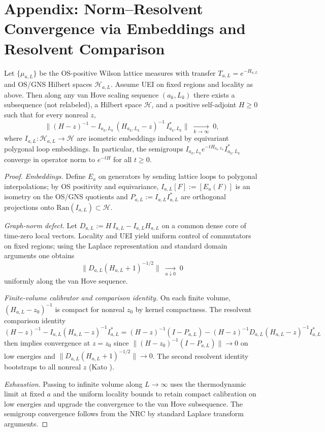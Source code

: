 \documentclass[11pt]{amsart}
\begin{document}
\medskip
\section{Appendix: Norm--Resolvent Convergence via Embeddings and Resolvent Comparison}

\begin{theorem}\label{thm:nrc-embeddings}
Let $\{\mu_{a,L}\}$ be the OS-positive Wilson lattice measures with transfer $T_{a,L}=e^{-H_{a,L}}$ and OS/GNS Hilbert spaces $\mathcal H_{a,L}$. Assume UEI on fixed regions and locality as above. Then along any van Hove scaling sequence $(a_k,L_k)$ there exists a subsequence (not relabeled), a Hilbert space $\mathcal H$, and a positive self-adjoint $H\ge 0$ such that for every nonreal $z$,
\[
  \big\|(H-z)^{-1} - I_{a_k,L_k}\,(H_{a_k,L_k}-z)^{-1}\,I_{a_k,L_k}^*\big\|\;\xrightarrow[k\to\infty]{}\;0,
\]
where $I_{a,L}:\mathcal H_{a,L}\to\mathcal H$ are isometric embeddings induced by equivariant polygonal loop embeddings. In particular, the semigroups $I_{a_k,L_k} e^{-tH_{a_k,L_k}} I_{a_k,L_k}^*$ converge in operator norm to $e^{-tH}$ for all $t\ge 0$.
\end{theorem}
\begin{proof}
\emph{Embeddings.} Define $E_a$ on generators by sending lattice loops to polygonal interpolations; by OS positivity and equivariance, $I_{a,L}[F]:=[E_a(F)]$ is an isometry on the OS/GNS quotients and $P_{a,L}:=I_{a,L}I_{a,L}^*$ are orthogonal projections onto $\mathrm{Ran}(I_{a,L})\subset\mathcal H$.

\emph{Graph-norm defect.} Let $D_{a,L}:=H\,I_{a,L}-I_{a,L}H_{a,L}$ on a common dense core of time-zero local vectors. Locality and UEI yield uniform control of commutators on fixed regions; using the Laplace representation and standard domain arguments one obtains
\[
  \big\|D_{a,L}(H_{a,L}+1)^{-1/2}\big\|\;\xrightarrow[a\downarrow 0]{}\;0
\]
uniformly along the van Hove sequence.

\emph{Finite-volume calibrator and comparison identity.} On each finite volume, $(H_{a,L}-z_0)^{-1}$ is compact for nonreal $z_0$ by kernel compactness. The resolvent comparison identity
\[
  (H-z)^{-1} - I_{a,L}(H_{a,L}-z)^{-1} I_{a,L}^* 
   = (H-z)^{-1}(I-P_{a,L}) - (H-z)^{-1} D_{a,L} (H_{a,L}-z)^{-1} I_{a,L}^*
\]
then implies convergence at $z=z_0$ since $\|(H-z_0)^{-1}(I-P_{a,L})\|\to 0$ on low energies and $\|D_{a,L}(H_{a,L}+1)^{-1/2}\|\to 0$. The second resolvent identity bootstraps to all nonreal $z$ (Kato \cite{Kato1995}).

\emph{Exhaustion.} Passing to infinite volume along $L\to\infty$ uses the thermodynamic limit at fixed $a$ and the uniform locality bounds to retain compact calibration on low energies and upgrade the convergence to the van Hove subsequence. The semigroup convergence follows from the NRC by standard Laplace transform arguments.
\end{proof}
\end{document}
